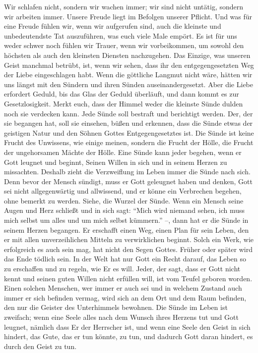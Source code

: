 Wir schlafen nicht, sondern wir wachen immer; wir sind nicht untätig, sondern wir arbeiten immer. Unsere Freude liegt im Befolgen unserer Pflicht. Und was für eine Freude fühlen wir, wenn wir aufgerufen sind, auch die kleinste und unbedeutendste Tat auszuführen, was euch viele Male empört. Es ist für uns weder schwer noch fühlen wir Trauer, wenn wir vorbeikommen, um sowohl den höchsten als auch den kleinsten Diensten nachzugehen. Das Einzige, was unseren Geist manchmal betrübt, ist, wenn wir sehen, dass ihr den entgegengesetzten Weg der Liebe eingeschlagen habt. Wenn die göttliche Langmut nicht wäre, hätten wir uns längst mit den Sündern und ihren Sünden auseinandergesetzt. Aber die Liebe erfordert Geduld, bis das Glas der Geduld überläuft, und dann kommt es zur Gesetzlosigkeit. Merkt euch, dass der Himmel weder die kleinste Sünde dulden noch sie verdecken kann. Jede Sünde soll bestraft und berichtigt werden. Der, der sie begangen hat, soll sie einsehen, büßen und erkennen, dass die Sünde etwas der geistigen Natur und den Söhnen Gottes Entgegengesetztes ist. Die Sünde ist keine Frucht des Unwissens, wie einige meinen, sondern die Frucht der Hölle, die Frucht der ungehorsamen Mächte der Hölle. Eine Sünde kann jeder begehen, wenn er Gott leugnet und beginnt, Seinen Willen in sich und in seinem Herzen zu missachten. Deshalb zieht die Verzweiflung im Leben immer die Sünde nach sich. Denn bevor der Mensch sündigt, muss er Gott geleugnet haben und denken, Gott sei nicht allgegenwärtig und allwissend, und er könne ein Verbrechen begehen, ohne bemerkt zu werden. Siehe, die Wurzel der Sünde. Wenn ein Mensch seine Augen und Herz schließt und in sich sagt: "`Mich wird niemand sehen, ich muss mich selbst um alles und um mich selbst kümmern."' --, dann hat er die Sünde in seinem Herzen begangen. Er erschafft einen Weg, einen Plan für sein Leben, den er mit allen unverzeihlichen Mitteln zu verwirklichen beginnt. Solch ein Werk, wie erfolgreich es auch sein mag, hat nicht den Segen Gottes. Früher oder später wird das Ende tödlich sein. In der Welt hat nur Gott ein Recht darauf, das Leben so zu erschaffen und zu regeln, wie Er es will. Jeder, der sagt, dass er Gott nicht kennt und seinen guten Willen nicht erfüllen will, ist vom Teufel geboren worden. Einen solchen Menschen, wer immer er auch sei und in welchem Zustand auch immer er sich befinden vermag, wird sich an dem Ort und dem Raum befinden, den nur die Geister des Unterhimmels bewohnen. Die Sünde im Leben ist zweifach; wenn eine Seele alles nach dem Wunsch ihres Herzens tut und Gott leugnet, nämlich dass Er der Herrscher ist, und wenn eine Seele den Geist in sich hindert, das Gute, das er tun könnte, zu tun, und dadurch Gott daran hindert, es durch den Geist zu tun. 


